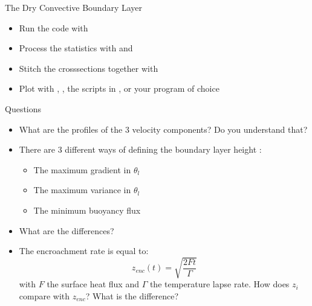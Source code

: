 \begin{frame}{The Dry Convective Boundary Layer}
\begin{itemize}
 \item Run the code with 
 \item Process the statistics with  and 
 \item Stitch the crosssections together with  
 \item Plot with , , the scripts in , or your program of choice
\end{itemize}
\end{frame}

\begin{frame}[allowframebreaks]{Questions}
 \begin{itemize}
  \item What are the profiles of the 3 velocity components? Do you understand that?
  \item There are 3 different ways of defining the boundary layer height :
\begin{itemize}
 \item The maximum gradient in $\theta_l$
 \item The maximum variance in $\theta_l$
 \item The minimum buoyancy flux
\end{itemize}
 \item What are the differences? 
 \item The encroachment rate is equal to: \[z_{enc}(t) = \sqrt{\frac{2 F t}{\Gamma}}\] with $F$ the surface heat flux and $\Gamma$ the temperature lapse rate. How does $z_i$ compare with $z_{enc}$? What is the difference?


\end{itemize}
\end{frame}
